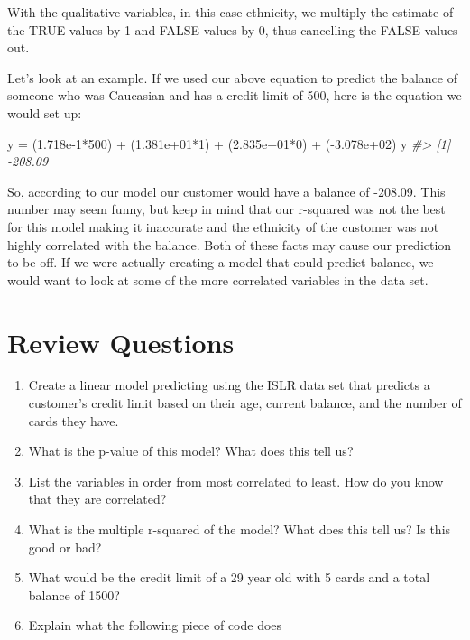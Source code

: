 \documentclass[
]{book}
\newenvironment{Shaded}{\begin{snugshade}}{\end{snugshade}}
\newcommand{\CommentTok}[1]{\textcolor[rgb]{0.56,0.35,0.01}{\textit{#1}}}
\newcommand{\DecValTok}[1]{\textcolor[rgb]{0.00,0.00,0.81}{#1}}
\newcommand{\FloatTok}[1]{\textcolor[rgb]{0.00,0.00,0.81}{#1}}
\newcommand{\NormalTok}[1]{#1}
\newcommand{\OtherTok}[1]{\textcolor[rgb]{0.56,0.35,0.01}{#1}}
\newcommand{\SpecialCharTok}[1]{\textcolor[rgb]{0.00,0.00,0.00}{#1}}
\begin{document}
With the qualitative variables, in this case ethnicity, we multiply the estimate of the TRUE values by 1 and FALSE values by 0, thus cancelling the FALSE values out.

Let's look at an example. If we used our above equation to predict the balance of someone who was Caucasian and has a credit limit of 500, here is the equation we would set up:

\begin{Shaded}
\begin{Highlighting}[]
\NormalTok{y }\OtherTok{=}\NormalTok{ (}\FloatTok{1.718e{-}1}\SpecialCharTok{*}\DecValTok{500}\NormalTok{) }\SpecialCharTok{+}\NormalTok{ (}\FloatTok{1.381e+01}\SpecialCharTok{*}\DecValTok{1}\NormalTok{) }\SpecialCharTok{+}\NormalTok{ (}\FloatTok{2.835e+01}\SpecialCharTok{*}\DecValTok{0}\NormalTok{) }\SpecialCharTok{+}\NormalTok{ (}\SpecialCharTok{{-}}\FloatTok{3.078e+02}\NormalTok{)}
\NormalTok{y}
\CommentTok{\#\textgreater{} [1] {-}208.09}
\end{Highlighting}
\end{Shaded}

So, according to our model our customer would have a balance of -208.09. This number may seem funny, but keep in mind that our r-squared was not the best for this model making it inaccurate and the ethnicity of the customer was not highly correlated with the balance. Both of these facts may cause our prediction to be off. If we were actually creating a model that could predict balance, we would want to look at some of the more correlated variables in the data set.

\hypertarget{review-questions-1}{%
\section{Review Questions}\label{review-questions-1}}

\begin{enumerate}
\def\labelenumi{\arabic{enumi})}
\item
  Create a linear model predicting using the ISLR data set that predicts a customer's credit limit based on their age, current balance, and the number of cards they have.
\item
  What is the p-value of this model? What does this tell us?
\item
  List the variables in order from most correlated to least. How do you know that they are correlated?
\item
  What is the multiple r-squared of the model? What does this tell us? Is this good or bad?
\item
  What would be the credit limit of a 29 year old with 5 cards and a total balance of 1500?
\item
  Explain what the following piece of code does
\end{enumerate}
\end{document}
